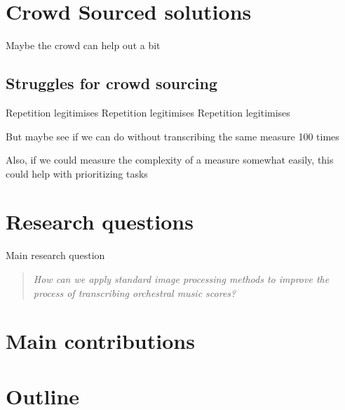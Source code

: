 \section{Crowd Sourced solutions}\label{sec:introduction-crowd-sourced-solutions}
Maybe the crowd can help out a bit

\subsection{Struggles for crowd sourcing}
Repetition legitimises
Repetition legitimises
Repetition legitimises

But maybe see if we can do without transcribing the same measure 100 times

Also, if we could measure the complexity of a measure somewhat easily, this could help with prioritizing tasks

\section{Research questions}\label{sec:introduction-research-questions}
Main research question
\begin{quote}
    \textit{How can we apply standard image processing methods to improve the process of transcribing orchestral music scores?}
\end{quote}

\section{Main contributions}\label{sec:introduction-contributions}

\section{Outline}\label{sec:introduction-outline}
